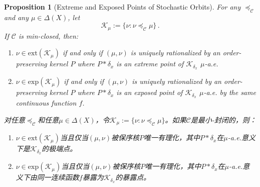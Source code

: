 \documentclass[12pt,letterpaper]{article}
\newenvironment{original}{\color{black}}{}
\newenvironment{translation}{\color{blue}}{}
\theoremstyle{plain}
\newtheorem{prop}{Proposition}
\theoremstyle{definition}
\theoremstyle{remark}
\newcommand{\C}{\mathcal{C}}
\newcommand{\Exp}{\mathrm{exp}}
\newcommand{\Ext}{\mathrm{ext}}
\theoremstyle{definition}
\begin{document}
\begin{prop}[Extreme and Exposed Points of Stochastic Orbits]\label{prop:exposed}
\begin{original}
For any $\preceq_{\C}$ and any $\mu \in \Delta(X)$, let
\[\mathcal{K}_\mu:= \Big\{\nu: \nu \preceq_\C \mu \Big\}\,.\]
If $\C$ is min-closed, then:
\begin{enumerate}
    \item [(i)] $\nu\in \Ext(\mathcal{K}_\mu)$ if and only if $(\mu, \nu)$ is uniquely rationalized by an order-preserving kernel $P$ where $P*\delta_x$ is an extreme point of $\mathcal{K}_{\delta_x}$ $\mu$-a.e.
    \item [(ii)] $\nu\in \Exp(\mathcal{K}_\mu)$ if and only if $(\mu, \nu)$ is uniquely rationalized by an order-preserving kernel $P$ where $P*\delta_x$ is an exposed point of $\mathcal{K}_{\delta_x}$ $\mu$-a.e. by the same continuous function $f$.
\end{enumerate}
\end{original}
\begin{translation}
对任意$\preceq_{\C}$和任意$\mu \in \Delta(X)$，令$\mathcal{K}_\mu:= \{\nu: \nu \preceq_\C \mu\}$。如果$\C$是最小-封闭的，则：
\begin{enumerate}
    \item [(i)] $\nu\in \Ext(\mathcal{K}_\mu)$当且仅当$(\mu, \nu)$被保序核$P$唯一有理化，其中$P*\delta_x$在$\mu$-a.e.意义下是$\mathcal{K}_{\delta_x}$的极端点。
    \item [(ii)] $\nu\in \Exp(\mathcal{K}_\mu)$当且仅当$(\mu, \nu)$被保序核$P$唯一有理化，其中$P*\delta_x$在$\mu$-a.e.意义下由同一连续函数$f$暴露为$\mathcal{K}_{\delta_x}$的暴露点。
\end{enumerate}
\end{translation}
\end{prop}
\end{document}
